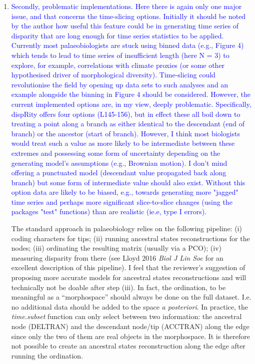 \documentclass[12pt,letterpaper]{article}
\begin{document}
\begin{enumerate}
\item{\textcolor{blue}{Secondly, problematic implementations.
Here there is again only one major issue, and that concerns the time-slicing options.
Initially it should be noted by the author how useful this feature could be in generating time series of disparity that are long enough for time series statistics to be applied.
Currently most palaeobiologists are stuck using binned data (e.g., Figure 4) which tends to lead to time series of insufficient length (here N = 3) to explore, for example, correlations with climate proxies (or some other hypothesised driver of morphological diversity).
Time-slicing could revolutionise the field by opening up data sets to such analyses and an example alongside the binning in Figure 4 should be considered.
However, the current implemented options are, in my view, deeply problematic.
Specifically, dispRity offers four options (L145-156), but in effect these all boil down to treating a point along a branch as either identical to the descendant (end of branch) or the ancestor (start of branch).
However, I think most biologists would treat such a value as more likely to be intermediate between these extremes and possessing some form of uncertainty depending on the generating model's assumptions (e.g., Brownian motion).
I don't mind offering a punctuated model (descendant value propagated back along branch) but some form of intermediate value should also exist.
Without this option data are likely to be biased, e.g., towards generating more "jagged" time series and perhaps more significant slice-to-slice changes (using the packages "test" functions) than are realistic (ie.e, type I errors).}}

The standard approach in palaeobiology relies on the following pipeline: (i) coding characters for tips; (ii) running ancestral states reconstructions for the nodes; (iii) ordinating the resulting matrix (usually via a PCO); (iv) measuring disparity from there (see Lloyd 2016 \textit{Biol J Lin Soc} for an excellent description of this pipeline).
I feel that the reviewer's suggestion of proposing more accurate models for ancestral states reconstructions and will technically not be doable after step (iii).
In fact, the ordination, to be meaningful as a ``morphospace'' should always be done on the full dataset.
I.e. no additional data should be added to the space \textit{a posteriori}.
In practice, the \textit{time.subset} function can only select between two information: the ancestral node (DELTRAN) and the descendant node/tip (ACCTRAN) along the edge since only the two of them are real objects in the morphospace.
It is therefore not possible to create an ancestral states reconstruction along the edge after running the ordination.


\end{enumerate}
\end{document}
